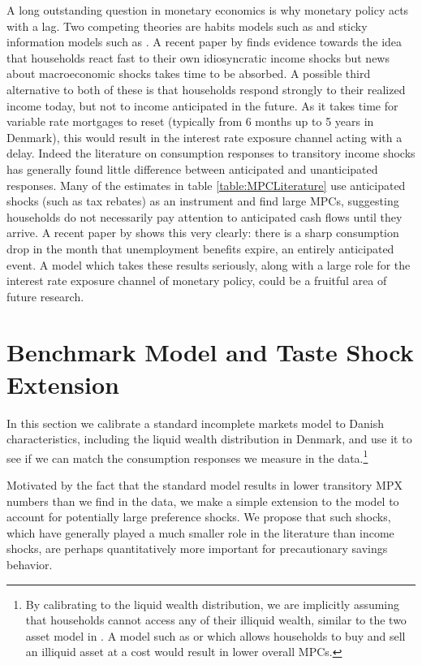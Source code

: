 \documentclass[titlepage]{\econtex}\newcommand{\texname}{ConsumptionHeterogeneity}
\begin{document}
A long outstanding question in monetary economics is why monetary policy acts with a lag. Two competing theories are habits models such as \cite{fuhrer_habit_2000} and sticky information models such as \cite{mankiw_sticky_2002}. A recent paper by \cite{carroll_sticky_2018} finds evidence towards the idea that households react fast to their own idiosyncratic income shocks but news about macroeconomic shocks takes time to be absorbed. A possible third alternative to both of these is that households respond strongly to their realized income today, but not to income anticipated in the future. As it takes time for variable rate mortgages to reset (typically from 6 months up to 5 years in Denmark), this would result in the interest rate exposure channel acting with a delay. Indeed the literature on consumption responses to transitory income shocks has generally found little difference between anticipated and unanticipated responses. Many of the estimates in table \ref{table:MPCLiterature} use anticipated shocks (such as tax rebates) as an instrument and find large MPCs, suggesting households do not necessarily pay attention to anticipated cash flows until they arrive. A recent paper by \cite{ganong_consumer_2017} shows this very clearly: there is a sharp consumption drop in the month that unemployment benefits expire, an entirely anticipated event. A model which takes these results seriously, along with a large role for the interest rate exposure channel of monetary policy, could be a fruitful area of future research. 

\section{Benchmark Model and Taste Shock Extension} \label{model}
In this section we calibrate a standard incomplete markets model to Danish characteristics, including the liquid wealth distribution in Denmark, and use it to see if we can match the consumption responses we measure in the data.\footnote{By calibrating to the liquid wealth distribution, we are implicitly assuming that households cannot access any of their illiquid wealth, similar to the two asset model in \cite{auclert_ikc}. A model such as \cite{violante_wealthy_2014} or \cite{gorea_liquidity_2017} which allows households to buy and sell an illiquid asset at a cost would result in lower overall MPCs.}

Motivated by the fact that the standard model results in lower transitory MPX numbers than we find in the data, we make a simple extension to the model to account for potentially large preference shocks. We propose that such shocks, which have generally played a much smaller role in the literature than income shocks, are perhaps quantitatively more important for precautionary savings behavior.
\end{document}
